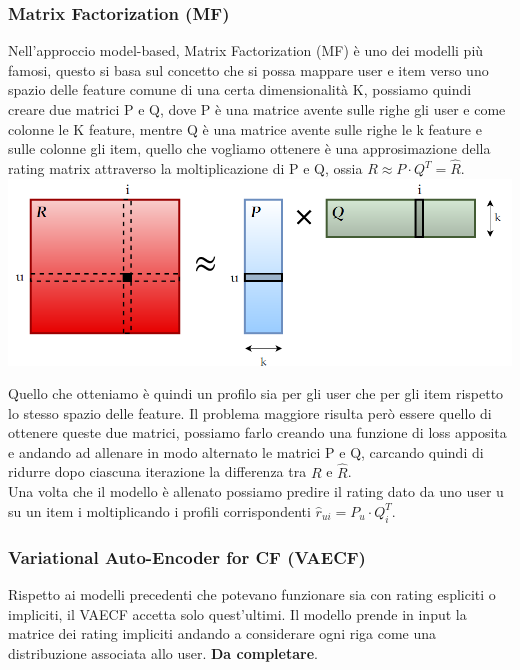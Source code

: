 \subsubsection{Matrix Factorization (MF)}
Nell'approccio model-based, Matrix Factorization (MF) è uno dei modelli più famosi, questo si basa sul concetto che si possa mappare user e item verso uno spazio delle feature comune di una certa dimensionalità K, possiamo quindi creare due matrici P e Q, dove P è una matrice avente sulle righe gli user e come colonne le K feature, mentre Q è una matrice avente sulle righe le k feature e sulle colonne gli item, quello che vogliamo ottenere è una approsimazione della rating matrix attraverso la moltiplicazione di P e Q, ossia $R \approx P \cdot Q^{T} = \hat{R}$.\\
\includegraphics[width=14.5cm]{figures/MF_disegno}

Quello che otteniamo è quindi un profilo sia per gli user che per gli item rispetto lo stesso spazio delle feature. Il problema maggiore risulta però essere quello di ottenere queste due matrici, possiamo farlo creando una funzione di loss apposita e andando ad allenare in modo alternato le matrici P e Q, carcando quindi di ridurre dopo ciascuna iterazione la differenza tra $R$ e $\hat{R}$.\\
Una volta che il modello è allenato possiamo predire il rating dato da uno user u su un item i moltiplicando i profili corrispondenti $\hat{r}_{ui} = P_u \cdot Q_{i}^{T}$.

\subsubsection{Variational Auto-Encoder for CF (VAECF)}
Rispetto ai modelli precedenti che potevano funzionare sia con rating espliciti o impliciti, il VAECF accetta solo quest'ultimi. Il modello prende in input la matrice dei rating impliciti andando a considerare ogni riga come una distribuzione associata allo user. \textbf{Da completare}.

